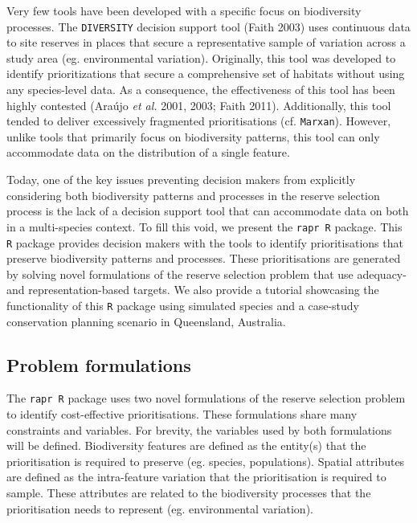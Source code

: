 \documentclass[11pt,]{article}
\begin{document}
Very few tools have been developed with a specific focus on biodiversity
processes. The \texttt{DIVERSITY} decision support tool (Faith 2003)
uses continuous data to site reserves in places that secure a
representative sample of variation across a study area (eg.
environmental variation). Originally, this tool was developed to
identify prioritizations that secure a comprehensive set of habitats
without using any species-level data. As a consequence, the
effectiveness of this tool has been highly contested ({{Araújo}}
\emph{et al.} 2001, 2003; Faith 2011). Additionally, this tool tended to
deliver excessively fragmented prioritisations (cf. \texttt{Marxan}).
However, unlike tools that primarily focus on biodiversity patterns,
this tool can only accommodate data on the distribution of a single
feature.

Today, one of the key issues preventing decision makers from explicitly
considering both biodiversity patterns and processes in the reserve
selection process is the lack of a decision support tool that can
accommodate data on both in a multi-species context. To fill this void,
we present the \texttt{rapr R} package. This \texttt{R} package provides
decision makers with the tools to identify prioritisations that preserve
biodiversity patterns and processes. These prioritisations are generated
by solving novel formulations of the reserve selection problem that use
adequacy- and representation-based targets. We also provide a tutorial
showcasing the functionality of this \texttt{R} package using simulated
species and a case-study conservation planning scenario in Queensland,
Australia.

\subsection{Problem formulations}\label{problem-formulations}

The \texttt{rapr R} package uses two novel formulations of the reserve
selection problem to identify cost-effective prioritisations. These
formulations share many constraints and variables. For brevity, the
variables used by both formulations will be defined. Biodiversity
features are defined as the entity(s) that the prioritisation is
required to preserve (eg. species, populations). Spatial attributes are
defined as the intra-feature variation that the prioritisation is
required to sample. These attributes are related to the biodiversity
processes that the prioritisation needs to represent (eg. environmental
variation).
\end{document}
